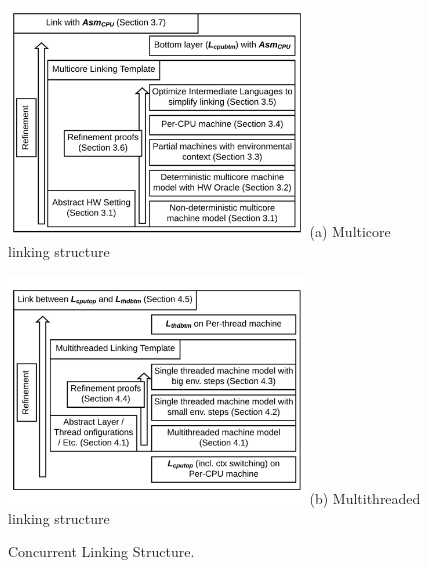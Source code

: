 \begin{figure}
\begin{center}
\includegraphics[width=0.7\textwidth]{figs/conlink/cpu_linking_structure}\newline
(a) Multicore linking structure
\end{center}
\begin{center}
\includegraphics[width=0.7\textwidth]{figs/conlink/thread_linking_structure}\newline
(b) Multithreaded linking structure
\end{center}
\caption{Concurrent Linking Structure.}
\label{fig:chapter:conlink:concurrent-linking-structure}
\end{figure}

